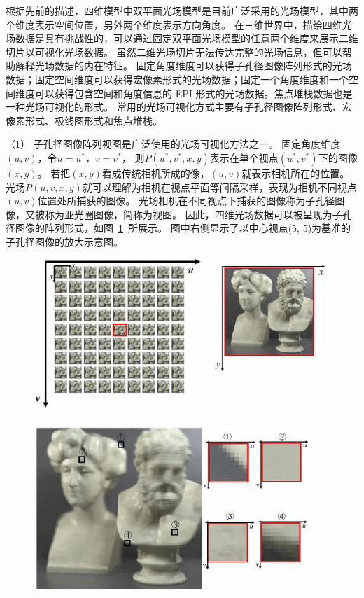 根据先前的描述，四维模型中双平面光场模型是目前广泛采用的光场模型，其中两个维度表示空间位置，另外两个维度表示方向角度。
在三维世界中，描绘四维光场数据是具有挑战性的，可以通过固定双平面光场模型的任意两个维度来展示二维切片以可视化光场数据。
虽然二维光场切片无法传达完整的光场信息，但可以帮助解释光场数据的内在特征。
固定角度维度可以获得子孔径图像阵列形式的光场数据；固定空间维度可以获得宏像素形式的光场数据；固定一个角度维度和一个空间维度可以获得包含空间和角度信息的 EPI 形式的光场数据。焦点堆栈数据也是一种光场可视化的形式。
常用的光场可视化方式主要有子孔径图像阵列形式、宏像素形式、极线图形式和焦点堆栈。
\par
%
%
%
（1）
子孔径图像阵列视图是广泛使用的光场可视化方法之一。
固定角度维度$(u, v)$，令$u = u^{*}$，$ v = v^{*} $，
则$P(u^{*}, v^{*}, x, y) $表示在单个视点$(u^{*}, v^{*})$下的图像$(x,y)$。
若把$(x,y)$看成传统相机所成的像，$(u, v)$就表示相机所在的位置。
光场$P(u, v, x, y)$就可以理解为相机在视点平面等间隔采样，表现为相机不同视点$(u, v)$位置处所捕获的图像。
光场相机在不同视点下捕获的图像称为子孔径图像，又被称为亚光圈图像，简称为视图。
因此，四维光场数据可以被呈现为子孔径图像的阵列形式，如图~\ref{chapter2_fig5:multi_photo}~所展示。
图中右侧显示了以中心视点(5, 5)为基准的子孔径图像的放大示意图。\par
%
%
\begin{figure}[!ht]
	\centering
	\includegraphics[width=0.75\linewidth]{figures/chapter2/multi_photo}
	\label{chapter2_fig5:multi_photo}
\end{figure}
%
%
%
%
\begin{figure}[!ht]
	\centering
	\includegraphics[width=0.80\linewidth]{figures/chapter2/macro_photo}
	\label{cpt2_fig5:macro_photo}
\end{figure}

